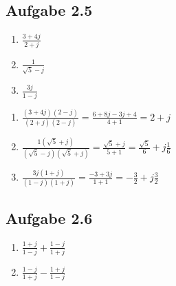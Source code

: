 \documentclass[
  ngerman,
  letterpaper,
]{scrbook}
\begin{document}
\subsection{Aufgabe 2.5}\label{aufgabe-2.5}

\begin{enumerate}
\def\labelenumi{\alph{enumi})}
\item
  \(\frac{3 + 4j}{2 + j}\)
\item
  \(\frac{1}{\sqrt{5} - j}\)
\item
  \(\frac{3j}{1 - j}\)
\end{enumerate}

\begin{tcolorbox}[enhanced jigsaw, titlerule=0mm, rightrule=.15mm, toprule=.15mm, colback=white, toptitle=1mm, bottomrule=.15mm, coltitle=black, leftrule=.75mm, arc=.35mm, colbacktitle=quarto-callout-caution-color!10!white, opacityback=0, bottomtitle=1mm, colframe=quarto-callout-caution-color-frame, opacitybacktitle=0.6, breakable, title=\textcolor{quarto-callout-caution-color}{\faFire}\hspace{0.5em}{Lösung 2.5}, left=2mm]

\begin{enumerate}
\def\labelenumi{\alph{enumi})}
\item
  \(\frac{(3 + 4j)(2 - j)}{(2 + j)(2 - j)} = \frac{6 + 8j - 3j + 4}{4 + 1} = 2 + j\)
\item
  \(\frac{1(\sqrt{5} + j)}{(\sqrt{5} - j)(\sqrt{5} + j)} = \frac{\sqrt{5} + j}{5 + 1} = \frac{\sqrt{5}}{6} + j\frac{1}{6}\)
\item
  \(\frac{3j(1 + j)}{(1 - j)(1 + j)} = \frac{-3 + 3j}{1 + 1}= -\frac{3}{2} + j\frac{3}{2}\)
\end{enumerate}

\end{tcolorbox}

\subsection{Aufgabe 2.6}\label{aufgabe-2.6}

\begin{enumerate}
\def\labelenumi{\alph{enumi})}
\item
  \(\frac{1 + j}{1 - j} + \frac{1 - j}{1 + j}\)
\item
  \(\frac{1 - j}{1 + j} - \frac{1 + j}{1 - j}\)
\end{enumerate}
\end{document}

